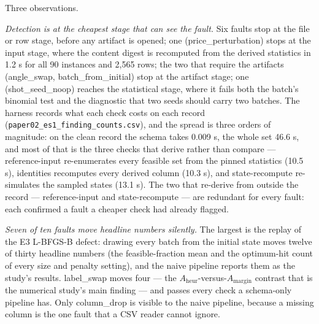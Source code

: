 \documentclass[acmsmall,screen,review]{acmart}
\begin{document}
Three observations.


\textit{Detection is at the cheapest stage that can see the fault.} Six faults stop at the file or row stage, before any artifact is opened; one (price\_perturbation) stops at the input stage, where the content digest is recomputed from the derived statistics in 1.2 s for all 90 instances and 2,565 rows; the two that require the artifacts (angle\_swap, batch\_from\_initial) stop at the artifact stage; one (shot\_seed\_noop) reaches the statistical stage, where it fails both the batch's binomial test and the diagnostic that two seeds should carry two batches. The harness records what each check costs on each record (\texttt{paper02\_\allowbreak{}es1\_\allowbreak{}finding\_\allowbreak{}counts.\allowbreak{}csv}), and the spread is three orders of magnitude: on the clean record the schema takes 0.009 s, the whole set 46.6 s, and most of that is the three checks that derive rather than compare --- reference-input re-enumerates every feasible set from the pinned statistics (10.5 s), identities recomputes every derived column (10.3 s), and state-recompute re-simulates the sampled states (13.1 s). The two that re-derive from outside the record --- reference-input and state-recompute --- are redundant for every fault: each confirmed a fault a cheaper check had already flagged.


\textit{Seven of ten faults move headline numbers silently.} The largest is the replay of the E3 L-BFGS-B defect: drawing every batch from the initial state moves twelve of thirty headline numbers (the feasible-fraction mean and the optimum-hit count of every size and penalty setting), and the naive pipeline reports them as the study's results. label\_swap moves four --- the $A_{\mathrm{heur}}$-versus-$A_{\mathrm{margin}}$ contrast that is the numerical study's main finding --- and passes every check a schema-only pipeline has. Only column\_drop is visible to the naive pipeline, because a missing column is the one fault that a CSV reader cannot ignore.
\end{document}
